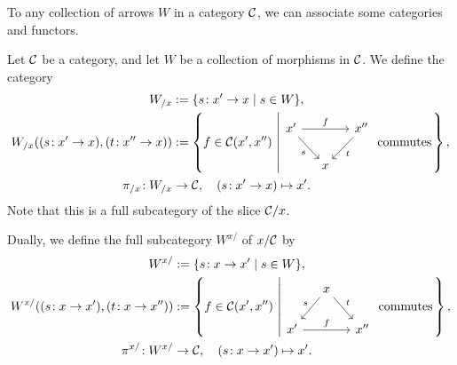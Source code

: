 To any collection of arrows \(W\) in a category \(\mathcal{C}\), we can associate some categories and functors.
\begin{definition}
	Let \(\mathcal{C}\) be a category, and let \(W\) be a collection of morphisms in \(\mathcal{C}\). We define the category
	\begin{align*}
		W_{/x} &:= \{ s\!:x'\to x\mid s\in W \},\\
		W_{/x}( (s\!:x'\to x), (t\!:x''\to x) ) &:= \left\{ f\in\calC(x',x'')\,\left\vert %
																		\begin{tikzcd}[column sep=small, ampersand replacement=\&]
																		x'\ar[rr,"f"] \& \& x''\\
																		 \& x\ar[from=ul,"s"']\ar[from=ur,"t"] \&
																		\end{tikzcd} \text{ commutes}\right. \right\},\\
		\pi_{/x}\!:W_{/x}&\to \calC,\quad ( s\!:x'\to x ) \mapsto x'.\\
	\end{align*}
	Note that this is a full subcategory of the slice \(\mathcal{C}/x\).

	Dually, we define the full subcategory \(W^{x/}\) of \(x/\mathcal{C}\) by
	\begin{align*}
		W^{x/} &:= \{ s\!:x\to x'\mid s\in W \},\\
		W^{x/}( (s\!:x\to x'), (t\!:x\to x'') ) &:= \left\{ f\in\calC(x',x'')\,\left\vert %
																		\begin{tikzcd}[column sep=small, ampersand replacement=\&]
																		 \& x\ar[dl,"s"']\ar[dr,"t"] \& \\
																		x'\ar[rr,"f"] \& \& x''
																		\end{tikzcd} \text{ commutes}\right. \right\},\\
		\pi^{x/}\!:W^{x/}&\to\calC,\quad ( s\!:x\to x' ) \mapsto x'.
	\end{align*}
\end{definition}

